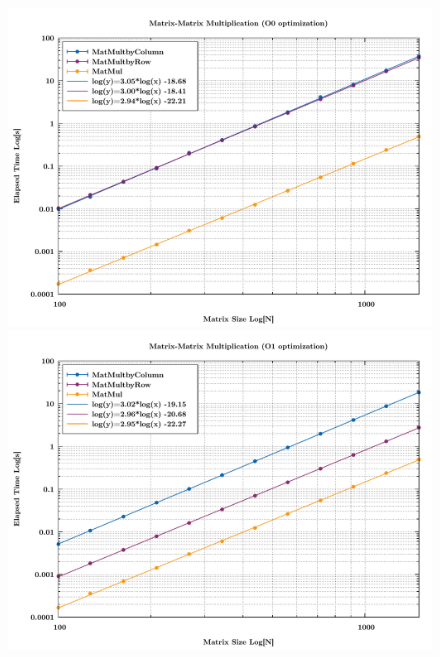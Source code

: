 \documentclass[rmp,10pt,onecolumn,fleqn,notitlepage]{revtex4-1}
\begin{document}
\begin{figure}[t!]
\begin{minipage}[c]{0.49\linewidth}
\centering
\includegraphics[width=1\textwidth]{image/matmult_O0.pdf}
\end{minipage}
\begin{minipage}[]{0.5\linewidth}
\centering
\includegraphics[width=1\textwidth]{image/matmult_O1.pdf}
\end{minipage} \\
\begin{minipage}[c]{0.49\linewidth}
\centering

\end{minipage}
\end{figure}
\end{document}
